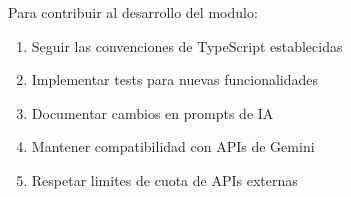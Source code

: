 \documentclass[12pt,a4paper]{article}
\begin{document}
Para contribuir al desarrollo del modulo:
\begin{enumerate}
    \item Seguir las convenciones de TypeScript establecidas
    \item Implementar tests para nuevas funcionalidades
    \item Documentar cambios en prompts de IA
    \item Mantener compatibilidad con APIs de Gemini
    \item Respetar limites de cuota de APIs externas
\end{enumerate}
\end{document}
